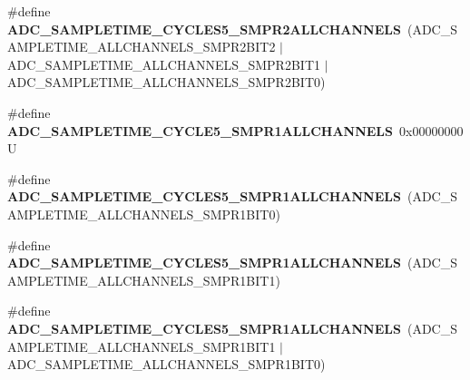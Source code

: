 \begin{DoxyCompactItemize}
\item 
\mbox{\label{group___a_d_c__sampling__times__all__channels_gafeb3479f9d022768e661767b6c247a15}} 
\#define {\bfseries A\+D\+C\+\_\+\+S\+A\+M\+P\+L\+E\+T\+I\+M\+E\+\_\+C\+Y\+C\+L\+E\+S5\+\_\+\+S\+M\+P\+R2\+A\+L\+L\+C\+H\+A\+N\+N\+E\+LS}~(A\+D\+C\+\_\+\+S\+A\+M\+P\+L\+E\+T\+I\+M\+E\+\_\+\+A\+L\+L\+C\+H\+A\+N\+N\+E\+L\+S\+\_\+\+S\+M\+P\+R2\+B\+I\+T2 $\vert$ A\+D\+C\+\_\+\+S\+A\+M\+P\+L\+E\+T\+I\+M\+E\+\_\+\+A\+L\+L\+C\+H\+A\+N\+N\+E\+L\+S\+\_\+\+S\+M\+P\+R2\+B\+I\+T1 $\vert$ A\+D\+C\+\_\+\+S\+A\+M\+P\+L\+E\+T\+I\+M\+E\+\_\+\+A\+L\+L\+C\+H\+A\+N\+N\+E\+L\+S\+\_\+\+S\+M\+P\+R2\+B\+I\+T0)
\item 
\mbox{\label{group___a_d_c__sampling__times__all__channels_ga7a96662f9bd0fb429774526613f154e7}} 
\#define {\bfseries A\+D\+C\+\_\+\+S\+A\+M\+P\+L\+E\+T\+I\+M\+E\+\_\+C\+Y\+C\+L\+E5\+\_\+\+S\+M\+P\+R1\+A\+L\+L\+C\+H\+A\+N\+N\+E\+LS}~0x00000000U
\item 
\mbox{\label{group___a_d_c__sampling__times__all__channels_ga9f143d6d3774d904caef4de401d01f15}} 
\#define {\bfseries A\+D\+C\+\_\+\+S\+A\+M\+P\+L\+E\+T\+I\+M\+E\+\_\+C\+Y\+C\+L\+E\+S5\+\_\+\+S\+M\+P\+R1\+A\+L\+L\+C\+H\+A\+N\+N\+E\+LS}~(A\+D\+C\+\_\+\+S\+A\+M\+P\+L\+E\+T\+I\+M\+E\+\_\+\+A\+L\+L\+C\+H\+A\+N\+N\+E\+L\+S\+\_\+\+S\+M\+P\+R1\+B\+I\+T0)
\item 
\mbox{\label{group___a_d_c__sampling__times__all__channels_gac35b289f50a9b7baa6613729ff872dbe}} 
\#define {\bfseries A\+D\+C\+\_\+\+S\+A\+M\+P\+L\+E\+T\+I\+M\+E\+\_\+C\+Y\+C\+L\+E\+S5\+\_\+\+S\+M\+P\+R1\+A\+L\+L\+C\+H\+A\+N\+N\+E\+LS}~(A\+D\+C\+\_\+\+S\+A\+M\+P\+L\+E\+T\+I\+M\+E\+\_\+\+A\+L\+L\+C\+H\+A\+N\+N\+E\+L\+S\+\_\+\+S\+M\+P\+R1\+B\+I\+T1)
\item 
\mbox{\label{group___a_d_c__sampling__times__all__channels_ga02a543f59835c39016502054cf0bfc63}} 
\#define {\bfseries A\+D\+C\+\_\+\+S\+A\+M\+P\+L\+E\+T\+I\+M\+E\+\_\+C\+Y\+C\+L\+E\+S5\+\_\+\+S\+M\+P\+R1\+A\+L\+L\+C\+H\+A\+N\+N\+E\+LS}~(A\+D\+C\+\_\+\+S\+A\+M\+P\+L\+E\+T\+I\+M\+E\+\_\+\+A\+L\+L\+C\+H\+A\+N\+N\+E\+L\+S\+\_\+\+S\+M\+P\+R1\+B\+I\+T1 $\vert$ A\+D\+C\+\_\+\+S\+A\+M\+P\+L\+E\+T\+I\+M\+E\+\_\+\+A\+L\+L\+C\+H\+A\+N\+N\+E\+L\+S\+\_\+\+S\+M\+P\+R1\+B\+I\+T0)

\end{DoxyCompactItemize}
